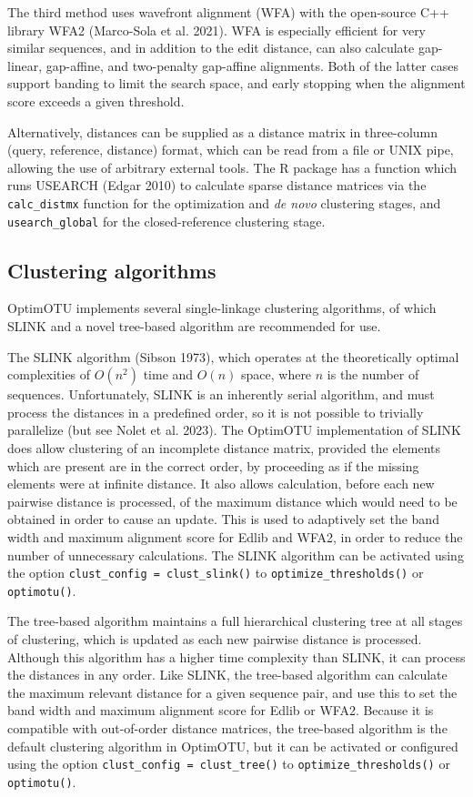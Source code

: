 \documentclass[
]{article}
\begin{document}
The third method uses wavefront alignment (WFA) with the open-source C++ library WFA2 (Marco-Sola et al. 2021).
WFA is especially efficient for very similar sequences, and in addition to the edit distance, can also calculate gap-linear, gap-affine, and two-penalty gap-affine alignments.
Both of the latter cases support banding to limit the search space, and early stopping when the alignment score exceeds a given threshold.

Alternatively, distances can be supplied as a distance matrix in three-column (query, reference, distance) format, which can be read from a
file or UNIX pipe, allowing the use of arbitrary external tools.
The R package has a function which runs USEARCH (Edgar 2010) to calculate sparse distance matrices via the \texttt{calc\_distmx} function for the optimization and \emph{de novo} clustering stages, and \texttt{usearch\_global} for the closed-reference clustering stage.

\subsection{Clustering algorithms}\label{clustering-algorithms}

OptimOTU implements several single-linkage clustering algorithms, of which SLINK and a novel tree-based algorithm are recommended for use.

The SLINK algorithm (Sibson 1973), which operates at the theoretically optimal complexities of \(O(n^2)\) time and \(O(n)\) space, where \(n\) is the number of sequences.
Unfortunately, SLINK is an inherently serial algorithm, and must process the distances in a predefined order, so it is not possible to trivially parallelize (but see Nolet et al. 2023).
The OptimOTU implementation of SLINK does allow clustering of an incomplete distance matrix, provided the elements which are present are in the correct order, by proceeding as if the missing elements were at infinite distance.
It also allows calculation, before each new pairwise distance is processed, of the maximum distance which would need to be obtained in order to cause an update.
This is used to adaptively set the band width and maximum alignment score for Edlib and WFA2, in order to reduce the number of unnecessary calculations.
The SLINK algorithm can be activated using the option \texttt{clust\_config\ =\ clust\_slink()} to \texttt{optimize\_thresholds()} or \texttt{optimotu()}.

The tree-based algorithm maintains a full hierarchical clustering tree at all stages of clustering, which is updated as each new pairwise distance is processed.
Although this algorithm has a higher time complexity than SLINK, it can process the distances in any order.
Like SLINK, the tree-based algorithm can calculate the maximum relevant distance for a given sequence pair, and use this to set the band width and maximum alignment score for Edlib or WFA2.
Because it is compatible with out-of-order distance matrices, the tree-based algorithm is the default clustering algorithm in OptimOTU, but it can be activated or configured using the option \texttt{clust\_config\ =\ clust\_tree()} to \texttt{optimize\_thresholds()} or \texttt{optimotu()}.
\end{document}
